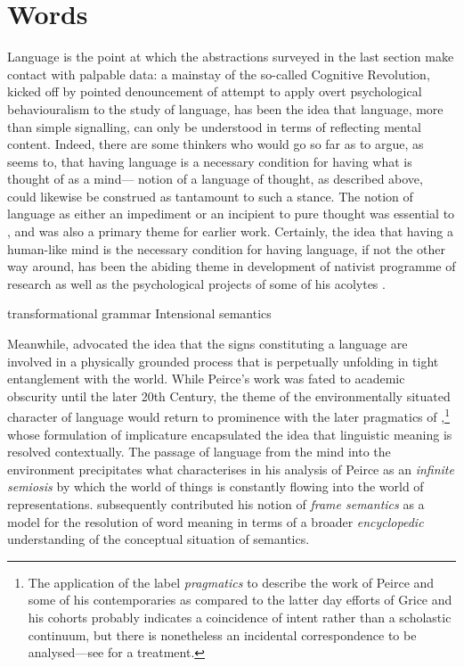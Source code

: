 \section{Words}
Language is the point at which the abstractions surveyed in the last section make contact with palpable data: a mainstay of the so-called Cognitive Revolution, kicked off by  pointed denouncement of  attempt to apply overt psychological behaviouralism to the study of language, has been the idea that language, more than simple signalling, can only be understood in terms of reflecting mental content.  Indeed, there are some thinkers who would go so far as to argue, as \cite{Dennett1996} seems to, that having language is a necessary condition for having what is thought of as a mind--- notion of a language of thought, as described above, could likewise be construed as tantamount to such a stance.  The notion of language as either an impediment or an incipient to pure thought was essential to \cite{Russell1905,Russell1931}, and was also a primary theme for  earlier work.  Certainly, the idea that having a human-like mind is the necessary condition for having language, if not the other way around, has been the abiding theme in development of  nativist programme of research as well as the psychological projects of some of his acolytes \citep{Pinker1994}.

transformational grammar
Intensional semantics

Meanwhile, \cite{Peirce1931} advocated the idea that the signs constituting a language are involved in a physically grounded process that is perpetually unfolding in tight entanglement with the world.  While Peirce's work was fated to academic obscurity until the later 20th Century, the theme of the environmentally situated character of language would return to prominence with the later pragmatics of \cite{Grice1975},\footnote{The application of the label \emph{pragmatics} to describe the work of Peirce and some of his contemporaries as compared to the latter day efforts of Grice and his cohorts probably indicates a coincidence of intent rather than a scholastic continuum, but there is nonetheless an incidental correspondence to be analysed---see \cite{Pietarinen2004} for a treatment.} whose formulation of implicature encapsulated the idea that linguistic meaning is resolved contextually.  The passage of language from the mind into the environment precipitates what \cite{Eco1976} characterises in his analysis of Peirce as an \emph{infinite semiosis} by which the world of things is constantly flowing into the world of representations.   subsequently contributed his notion of \emph{frame semantics} as a model for the resolution of word meaning in terms of a broader \emph{encyclopedic} understanding of the conceptual situation of semantics.


